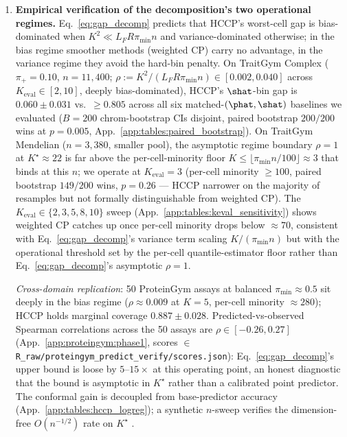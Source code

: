 \begin{enumerate}
    \item \textbf{Empirical verification of the decomposition's two operational regimes.} Eq.~\eqref{eq:gap_decomp} predicts that HCCP's worst-cell gap is bias-dominated when $K^2 \ll L_F R \pi_{\min} n$ and variance-dominated otherwise; in the bias regime smoother methods (weighted CP) carry no advantage, in the variance regime they avoid the hard-bin penalty. On TraitGym Complex ($\pi_+=0.10$, $n=11{,}400$; $\rho := K^2/(L_F R \pi_{\min} n) \in [0.002, 0.040]$ across $K_{\mathrm{eval}} \in [2, 10]$, deeply bias-dominated), HCCP's $\shat$-bin gap is $0.060 \pm 0.031$ vs.\ $\geq 0.805$ across all six matched-$(\phat, \shat)$ baselines we evaluated ($B = 200$ chrom-bootstrap CIs disjoint, paired bootstrap $200/200$ wins at $p = 0.005$, App.~\ref{app:tables:paired_bootstrap}). On TraitGym Mendelian ($n = 3{,}380$, smaller pool), the asymptotic regime boundary $\rho = 1$ at $K^\star \approx 22$ is far above the per-cell-minority floor $K \leq \lfloor \pi_{\min} n / 100\rfloor \approx 3$ that binds at this $n$; we operate at $K_{\mathrm{eval}} = 3$ (per-cell minority $\geq 100$, paired bootstrap $149/200$ wins, $p = 0.26$ — HCCP narrower on the majority of resamples but not formally distinguishable from weighted CP). The $K_{\mathrm{eval}} \in \{2,3,5,8,10\}$ sweep (App.~\ref{app:tables:keval_sensitivity}) shows weighted CP catches up once per-cell minority drops below $\approx 70$, consistent with Eq.~\eqref{eq:gap_decomp}'s variance term scaling $K / (\pi_{\min} n)$ but with the operational threshold set by the per-cell quantile-estimator floor rather than Eq.~\eqref{eq:gap_decomp}'s asymptotic $\rho = 1$.

    \emph{Cross-domain replication}: 50 ProteinGym \citep{notin2023proteingym} assays at balanced $\pi_{\min} \approx 0.5$ sit deeply in the bias regime ($\rho \approx 0.009$ at $K = 5$, per-cell minority $\approx 280$); HCCP holds marginal coverage $0.887 \pm 0.028$. Predicted-vs-observed Spearman correlations across the 50 assays are $\rho \in [-0.26, 0.27]$ (App.~\ref{app:proteingym:phase1}, scores $\in$ \texttt{R\_raw/proteingym\_predict\_verify/scores.json}): Eq.~\eqref{eq:gap_decomp}'s upper bound is loose by $5$--$15\times$ at this operating point, an honest diagnostic that the bound is asymptotic in $K^\star$ rather than a calibrated point predictor. The conformal gain is decoupled from base-predictor accuracy (App.~\ref{app:tables:hccp_logreg}); a synthetic $n$-sweep verifies the dimension-free $O(n^{-1/2})$ rate on $K^\star$ \citep{ourcode}.
\end{enumerate}

